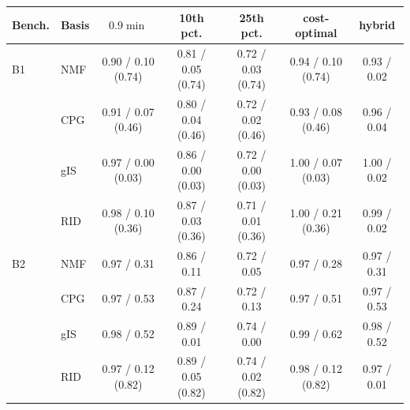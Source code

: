 \begin{tabular}{@{}llccccc@{}}
\toprule
Bench. & Basis & $0.9\min$ & 10th pct. & 25th pct. & cost-optimal & hybrid \\
\midrule
B1 & NMF & 0.90 / 0.10 (0.74) & 0.81 / 0.05 (0.74) & 0.72 / 0.03 (0.74) & 0.94 / 0.10 (0.74) & 0.93 / 0.02 \\
 & CPG & 0.91 / 0.07 (0.46) & 0.80 / 0.04 (0.46) & 0.72 / 0.02 (0.46) & 0.93 / 0.08 (0.46) & 0.96 / 0.04 \\
 & gIS & 0.97 / 0.00 (0.03) & 0.86 / 0.00 (0.03) & 0.72 / 0.00 (0.03) & 1.00 / 0.07 (0.03) & 1.00 / 0.02 \\
 & RID & 0.98 / 0.10 (0.36) & 0.87 / 0.03 (0.36) & 0.71 / 0.01 (0.36) & 1.00 / 0.21 (0.36) & 0.99 / 0.02 \\
\midrule
B2 & NMF & 0.97 / 0.31 & 0.86 / 0.11 & 0.72 / 0.05 & 0.97 / 0.28 & 0.97 / 0.31 \\
 & CPG & 0.97 / 0.53 & 0.87 / 0.24 & 0.72 / 0.13 & 0.97 / 0.51 & 0.97 / 0.53 \\
 & gIS & 0.98 / 0.52 & 0.89 / 0.01 & 0.74 / 0.00 & 0.99 / 0.62 & 0.98 / 0.52 \\
 & RID & 0.97 / 0.12 (0.82) & 0.89 / 0.05 (0.82) & 0.74 / 0.02 (0.82) & 0.98 / 0.12 (0.82) & 0.97 / 0.01 \\
\bottomrule
\end{tabular}
